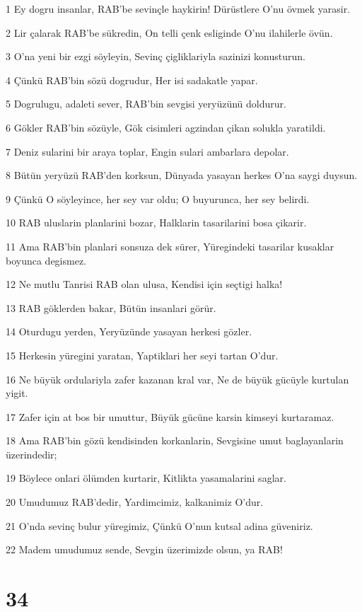 \par 1 Ey dogru insanlar, RAB'be sevinçle haykirin! Dürüstlere O'nu övmek yarasir.
\par 2 Lir çalarak RAB'be sükredin, On telli çenk esliginde O'nu ilahilerle övün.
\par 3 O'na yeni bir ezgi söyleyin, Sevinç çigliklariyla sazinizi konusturun.
\par 4 Çünkü RAB'bin sözü dogrudur, Her isi sadakatle yapar.
\par 5 Dogrulugu, adaleti sever, RAB'bin sevgisi yeryüzünü doldurur.
\par 6 Gökler RAB'bin sözüyle, Gök cisimleri agzindan çikan solukla yaratildi.
\par 7 Deniz sularini bir araya toplar, Engin sulari ambarlara depolar.
\par 8 Bütün yeryüzü RAB'den korksun, Dünyada yasayan herkes O'na saygi duysun.
\par 9 Çünkü O söyleyince, her sey var oldu; O buyurunca, her sey belirdi.
\par 10 RAB uluslarin planlarini bozar, Halklarin tasarilarini bosa çikarir.
\par 11 Ama RAB'bin planlari sonsuza dek sürer, Yüregindeki tasarilar kusaklar boyunca degismez.
\par 12 Ne mutlu Tanrisi RAB olan ulusa, Kendisi için seçtigi halka!
\par 13 RAB göklerden bakar, Bütün insanlari görür.
\par 14 Oturdugu yerden, Yeryüzünde yasayan herkesi gözler.
\par 15 Herkesin yüregini yaratan, Yaptiklari her seyi tartan O'dur.
\par 16 Ne büyük ordulariyla zafer kazanan kral var, Ne de büyük gücüyle kurtulan yigit.
\par 17 Zafer için at bos bir umuttur, Büyük gücüne karsin kimseyi kurtaramaz.
\par 18 Ama RAB'bin gözü kendisinden korkanlarin, Sevgisine umut baglayanlarin üzerindedir;
\par 19 Böylece onlari ölümden kurtarir, Kitlikta yasamalarini saglar.
\par 20 Umudumuz RAB'dedir, Yardimcimiz, kalkanimiz O'dur.
\par 21 O'nda sevinç bulur yüregimiz, Çünkü O'nun kutsal adina güveniriz.
\par 22 Madem umudumuz sende, Sevgin üzerimizde olsun, ya RAB!

\chapter{34}

